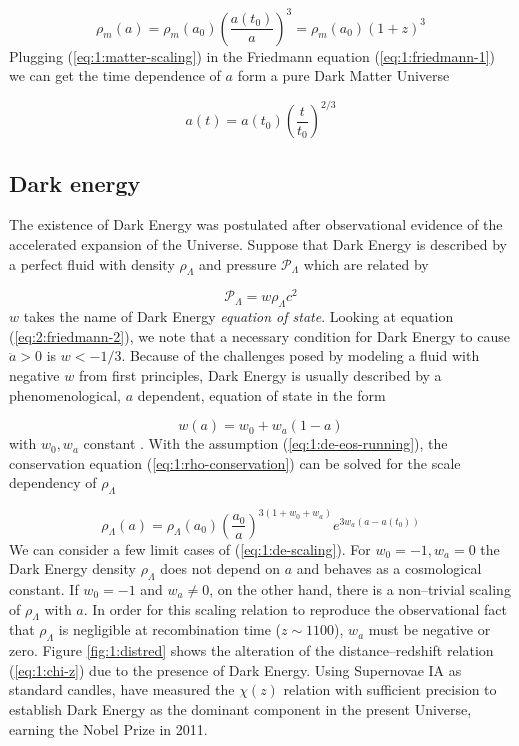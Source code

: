 \begin{equation}
\label{eq:1:matter-scaling}
\rho_m(a) = \rho_m(a_0)\left(\frac{a(t_0)}{a}\right)^3 = \rho_m(a_0)(1+z)^3 
\end{equation} 
%
Plugging (\ref{eq:1:matter-scaling}) in the Friedmann equation (\ref{eq:1:friedmann-1}) we can get the time dependence of $a$ form a pure Dark Matter Universe

\begin{equation}
\label{eq:1:matter-only-a}
a(t) = a(t_0)\left(\frac{t}{t_0}\right)^{2/3}
\end{equation}

\subsection{Dark energy}
The existence of Dark Energy was postulated after observational evidence of the accelerated expansion of the Universe. Suppose that Dark Energy is described by a perfect fluid with density $\rho_\Lambda$ and pressure $\mathcal{P}_\Lambda$ which are related by

\begin{equation}
\label{eq:1:de-eos}
\mathcal{P}_\Lambda = w\rho_\Lambda c^2
\end{equation}
%
$w$ takes the name of Dark Energy \textit{equation of state}. Looking at equation (\ref{eq:2:friedmann-2}), we note that a necessary condition for Dark Energy to cause $\ddot{a}>0$ is $w<-1/3$. Because of the challenges posed by modeling a fluid with negative $w$ from first principles, Dark Energy is usually described by a phenomenological, $a$ dependent, equation of state in the form

\begin{equation}
\label{eq:1:de-eos-running}
w(a) = w_0 + w_a(1-a)
\end{equation}
%
with $w_0,w_a$ constant \citep{LinderDE}. With the assumption (\ref{eq:1:de-eos-running}), the conservation equation (\ref{eq:1:rho-conservation}) can be solved for the scale dependency of $\rho_\Lambda$

\begin{equation}
\label{eq:1:de-scaling}
\rho_\Lambda(a) = \rho_\Lambda(a_0)\left(\frac{a_0}{a}\right)^{3(1+w_0+w_a)}e^{3w_a(a-a(t_0))} 
\end{equation}
%
We can consider a few limit cases of (\ref{eq:1:de-scaling}). For $w_0=-1,w_a=0$ the Dark Energy density $\rho_\Lambda$ does not depend on $a$ and behaves as a cosmological constant. If $w_0=-1$ and $w_a\neq 0$, on the other hand, there is a non--trivial scaling of $\rho_\Lambda$ with $a$. In order for this scaling relation to reproduce the observational fact that $\rho_\Lambda$ is negligible at recombination time ($z\sim 1100$), $w_a$ must be negative or zero. Figure \ref{fig:1:distred} shows the alteration of the distance--redshift relation (\ref{eq:1:chi-z}) due to the presence of Dark Energy. Using Supernovae IA as standard candles, \citep{PerlmutterNobel} have measured the $\chi(z)$ relation with sufficient precision to establish Dark Energy as the dominant component in the present Universe, earning the Nobel Prize in 2011.  

